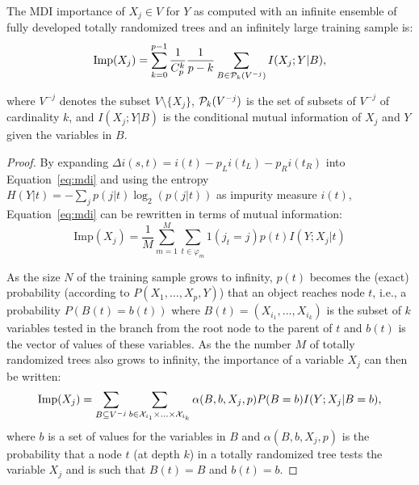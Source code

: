 \begin{theorem}\label{thm:imp}
The MDI importance of $X_j \in V$ for $Y$ as computed
with an   infinite ensemble of fully developed totally randomized trees and an
infinitely large training sample is:
  \begin{equation}\label{eqn:imp-full}
  \text{Imp}(X_j)=\sum_{k=0}^{p-1} \frac{1}{C_p^k} \frac{1}{p-k} \sum_{B \in {\cal P}_k(V^{-j})} I(X_j;Y|B),
  \end{equation}
\end{theorem}
\noindent where $V^{-j}$ denotes the subset $V \setminus \{X_j\}$, ${\cal
P}_k(V^{-j})$ is the set of subsets of  $V^{-j}$ of cardinality $k$, and
$I(X_j;Y|B)$ is the conditional mutual information of $X_{j}$ and $Y$ given the
variables in $B$.

\begin{proof}
By expanding $\Delta i(s, t) = i(t) - p_L i(t_L) - p_R i(t_R)$ into
Equation~\ref{eq:mdi} and using the entropy $H(Y|t) = -\sum_j p(j|t) \log_2(p(j|t))$
as impurity measure $i(t)$, Equation~\ref{eq:mdi} can be rewritten in terms of
mutual information:
\begin{equation}
\text{Imp}(X_j) = \frac{1}{M} \sum_{m=1}^M \sum_{t \in \varphi_m} 1(j_t = j) p(t) I(Y;X_j|t)
\end{equation}

As the size $N$ of the training sample grows to infinity, $p(t)$ becomes the
(exact) probability (according to $P(X_1,\ldots,X_p,Y)$) that an object reaches
node $t$, i.e., a probability $P(B(t)=b(t))$ where $B(t)=(X_{i_1}, ...,
X_{i_{k}})$ is the subset of $k$ variables tested in the branch from the root
node to the parent of $t$ and $b(t)$ is the vector of values of these
variables. As the the number $M$ of totally randomized trees also grows to
infinity, the importance of a variable $X_j$ can then be written:
\begin{equation}
\text{Imp}(X_j)=\sum_{B\subseteq V^{-j}} \sum_{b\in {\cal X}_{i_1}\times ... \times {\cal X}_{i_{k}} } \alpha(B,b,X_j,p) P(B=b) I(Y;X_j|B=b),
\end{equation}
where $b$ is a set of values for the variables in $B$ and $\alpha(B,b,X_j,p)$ is
the probability that a node $t$ (at depth $k$) in a totally randomized tree
tests the variable $X_j$ and is such that $B(t)=B$ and $b(t)=b$.


\end{proof}
